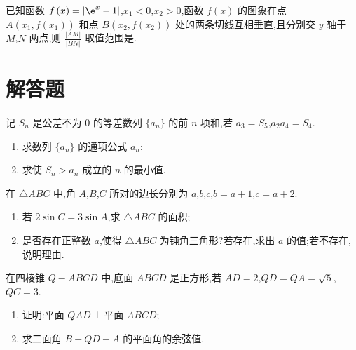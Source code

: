 \begin{problem}
已知函数 \(f\left( x \right)=\left| \e^x-1 \right|\),\(x_1<0\),\(x_2>0\),函数 \(f\left( x \right)\) 的图象在点 \(A\left( x_1,f\left( x_1 \right) \right)\) 和点 \(B\left( x_2,f\left( x_2 \right) \right)\) 处的两条切线互相垂直,且分别交 \(y\) 轴于 \(M\),\(N\) 两点,则 \(\frac{\left| AM \right|}{\left| BN \right|}\) 取值范围是\fillinblank{}.

\end{problem}

\section{解答题}

\begin{problem}
记 \(S_n\) 是公差不为 \(0\) 的等差数列 \(\{a_n\}\) 的前 \(n\) 项和,若 \(a_3=S_5\),\(a_2a_4=S_4\).

\begin{enumerate}
\item 求数列 \(\{a_n\}\) 的通项公式 \(a_n\);
\item 求使 \(S_n>a_n\) 成立的 \(n\) 的最小值.
\end{enumerate}
\end{problem}

\begin{problem}
在 \(\triangle ABC\) 中,角 \(A\),\(B\),\(C\) 所对的边长分别为 \(a\),\(b\),\(c\),\(b=a+1\),\(c=a+2\).

\begin{enumerate}
\item 若 \(2\sin C=3\sin A\),求 \(\triangle ABC\) 的面积;
\item 是否存在正整数 \(a\),使得 \(\triangle ABC\) 为钝角三角形?若存在,求出 \(a\) 的值;若不存在,说明理由.
\end{enumerate}
\end{problem}

\begin{problem}
在四棱锥 \(Q-ABCD\) 中,底面 \(ABCD\) 是正方形,若 \(AD=2\),\(QD=QA=\sqrt5\),\(QC=3\).

\begin{enumerate}
\item 证明:平面 \(QAD\perp \text{平面 }ABCD\);
\item 求二面角 \(B-QD-A\) 的平面角的余弦值.
\end{enumerate}

\end{problem}

